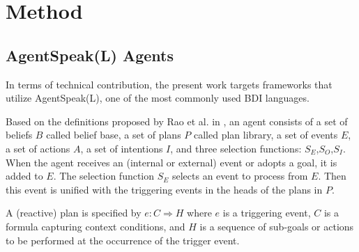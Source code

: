 

\section{Method}
 \label{sec:method}


\subsection{AgentSpeak(L) Agents}
\label{ssec:agentspeak}
In terms of technical contribution, the present work targets frameworks that utilize AgentSpeak(L), one of the most commonly used BDI languages. 

Based on the definitions proposed by Rao et al. in \cite{Rao1995,RaoAS1996}, an agent consists of a set of beliefs $B$ called belief base, a set of plans $P$ called plan library, a set of events $E$, a set of actions $A$, a set of intentions $I$, and three selection functions: $S_E$,$S_O$,$S_I$. When the agent receives an (internal or external) event or adopts a goal, it is added to $E$. The selection function $S_E$ selects an event to process from $E$. Then this event is unified with the triggering events in the heads of the plans in $P$. 

\begin{definition}
[Plan] A (reactive) plan is specified by $e : C \Rightarrow H$ where $e$ is a triggering event, $C$ is a formula capturing context conditions, and $H$ is a sequence of sub-goals or actions to be performed at the occurrence of the trigger event.
\end{definition}

